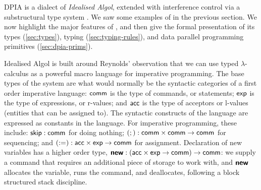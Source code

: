 
DPIA is a dialect of  \emph{Idealised Algol}, extended with interference control via a substructural type system \cite{OHearnPTT99}. We saw some examples of \DPIA in the previous section. We now highlight the major features of \DPIA, and then give the formal presentation of its types (\autoref{sec:types}), typing (\autoref{sec:typing-rules}), and data parallel programming primitives (\autoref{sec:dpia-prims}).

Idealised Algol is built around Reynolds' observation that we can use typed $\lambda$-calculus as a powerful macro language for imperative programming. The base types of the system are what would normally be the syntactic categories of a first order imperative language: $\mathsf{comm}$ is the type of commands, or statements; $\mathsf{exp}$ is the type of expressions, or r-values; and $\mathsf{acc}$ is the type of acceptors or l-values (entities that can be assigned to). The syntactic constructs of the language are expressed as constants in the language. For imperative programming, these include: $\mathsf{skip} : \mathsf{comm}$ for doing nothing; $(;) : \mathsf{comm} \times \mathsf{comm} \to \mathsf{comm}$ for sequencing; and $(:=) : \mathsf{acc} \times \mathsf{exp} \to \mathsf{comm}$ for assignment. Declaration of new variables has a higher order type, $\bm{\mathsf{new}} : (\mathsf{acc} \times \mathsf{exp} \to \mathsf{comm}) \to \mathsf{comm}$: we supply a command that requires an additional piece of storage to work with, and $\bm{\mathsf{new}}$ allocates the variable, runs the command, and deallocates, following a block structured stack discipline.


